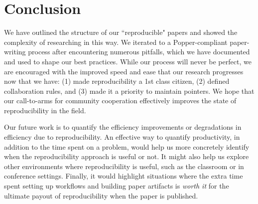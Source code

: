 \section{Conclusion}

We have outlined the structure of our ``reproducible" papers and showed the
complexity of researching in this way. We iterated to a Popper-compliant
paper-writing process after encountering numerous pitfalls, which we have
documented and used to shape our best practices. While our process will never
be perfect, we are encouraged with the improved speed and ease that our research
progresses now that we have: (1) made reproducibility a 1st class citizen, (2)
defined collaboration rules, and (3) made it a priority to maintain pointers.
We hope that our call-to-arms for community cooperation effectively improves
the state of reproducibility in the field.

Our future work is to quantify the efficiency improvements or degradations in
efficiency due to reproducibility. An effective way to quantify productivity,
in addition to the time spent on a problem, would help us more concretely
identify when the reproducibility approach is useful or not. It might also help
us explore other environments where reproducibility is useful, such as the
classroom or in conference settings. Finally, it would highlight situations
where the extra time spent setting up workflows and building paper artifacts is
{\it worth it} for the ultimate payout of reproducibility when the paper is
published.

